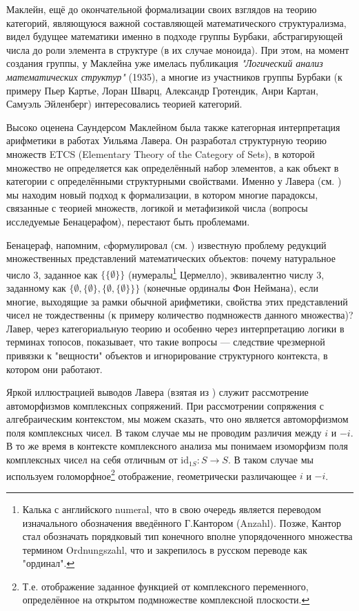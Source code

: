 \documentclass[14pt]{extarticle}
\begin{document}
	Маклейн, ещё до окончательной формализации своих взглядов на теорию категорий, являющуюся важной составляющей математического структурализма, видел будущее математики именно в подходе группы Бурбаки, абстрагирующей числа до роли элемента в структуре (в их случае моноида). При этом, на момент создания группы, у Маклейна уже имелась публикация \textit{"Логический анализ математических структур"} (1935), а многие из участников группы Бурбаки (к примеру Пьер Картье, Лоран Шварц, Александр Гротендик, Анри Картан, Самуэль Эйленберг) интересовались теорией категорий. 
	
	Высоко оценена Саундерсом Маклейном была также категорная интерпретация арифметики в работах Уильяма Лавера. Он разработал структурную теорию множеств ETCS (Elementary Theory of the Category of Sets), в которой множество не определяется как определённый набор элементов, а как объект в категории с определёнными структурными свойствами. Именно у Лавера (см. \cite{Lawvere1964}) мы находим новый подход к формализации, в котором многие парадоксы, связанные с теорией множеств, логикой и метафизикой числа (вопросы исследуемые Бенацерафом), перестают быть проблемами. 
	
	Бенацераф, напомним, cформулировал (см. \cite{benacerraf1965}) известную проблему редукций множественных представлений математических объектов: почему натуральное число 3, заданное как \texttt{{$\{\{\emptyset\}\}$}} (нумералы\footnote{Калька с английского numeral, что в свою очередь является переводом изначального обозначения введённого Г.Кантором (Anzahl). Позже, Кантор стал обозначать порядковый тип конечного вполне упорядоченного множества термином Ordnungszahl, что и закрепилось в русском переводе как "ординал".} Цермелло), эквивалентно числу 3, заданному как \texttt{{$\{\emptyset, \{\emptyset\}, \{\emptyset, \{\emptyset\}\}\}$}} (конечные ординалы Фон Неймана), если многие, выходящие за рамки обычной арифметики, свойства этих представлений чисел не тождественны (к примеру количество подмножеств данного множества)? Лавер, через категориальную теорию и особенно через интерпретацию логики в терминах топосов, показывает, что такие вопросы — следствие чрезмерной привязки к "вещности" объектов и игнорирование структурного контекста, в котором они работают.

	Яркой иллюстрацией выводов Лавера (взятая из \cite{reck2020}) служит рассмотрение автоморфизмов комплексных сопряжений. При рассмотрении сопряжения с алгебраическим контекстом, мы можем сказать, что оно является автоморфизмом поля комплексных чисел. В таком случае мы не проводим различия между $i$ и $-i$. В то же время в контексте комплексного анализа мы понимаем изоморфизм поля комплексных чисел на себя отличным от $\text{id}_{1S}: S \to S$. В таком случае мы используем голоморфное\footnote{Т.е. отображение заданное функцией от комплексного переменного, определённое на открытом подмножестве комплексной плоскости.} отображение, геометрически различающее $i$ и $-i$.
	
\end{document}
